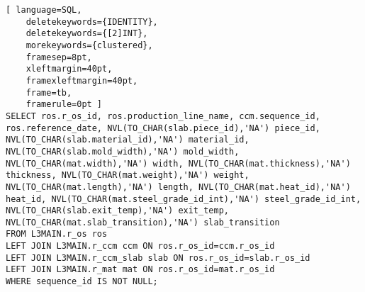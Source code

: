 \documentclass{article}
\begin{document}
	
\thispagestyle{empty}
\begin{lstlisting}[ language=SQL,
	deletekeywords={IDENTITY},
	deletekeywords={[2]INT},
	morekeywords={clustered},
	framesep=8pt,
	xleftmargin=40pt,
	framexleftmargin=40pt,
	frame=tb,
	framerule=0pt ]
SELECT ros.r_os_id, ros.production_line_name, ccm.sequence_id, ros.reference_date, NVL(TO_CHAR(slab.piece_id),'NA') piece_id, NVL(TO_CHAR(slab.material_id),'NA') material_id, NVL(TO_CHAR(slab.mold_width),'NA') mold_width, NVL(TO_CHAR(mat.width),'NA') width, NVL(TO_CHAR(mat.thickness),'NA') thickness, NVL(TO_CHAR(mat.weight),'NA') weight, NVL(TO_CHAR(mat.length),'NA') length, NVL(TO_CHAR(mat.heat_id),'NA') heat_id, NVL(TO_CHAR(mat.steel_grade_id_int),'NA') steel_grade_id_int, NVL(TO_CHAR(slab.exit_temp),'NA') exit_temp, NVL(TO_CHAR(mat.slab_transition),'NA') slab_transition
FROM L3MAIN.r_os ros 
LEFT JOIN L3MAIN.r_ccm ccm ON ros.r_os_id=ccm.r_os_id 
LEFT JOIN L3MAIN.r_ccm_slab slab ON ros.r_os_id=slab.r_os_id 
LEFT JOIN L3MAIN.r_mat mat ON ros.r_os_id=mat.r_os_id 
WHERE sequence_id IS NOT NULL;
\end{lstlisting}
\end{document}
